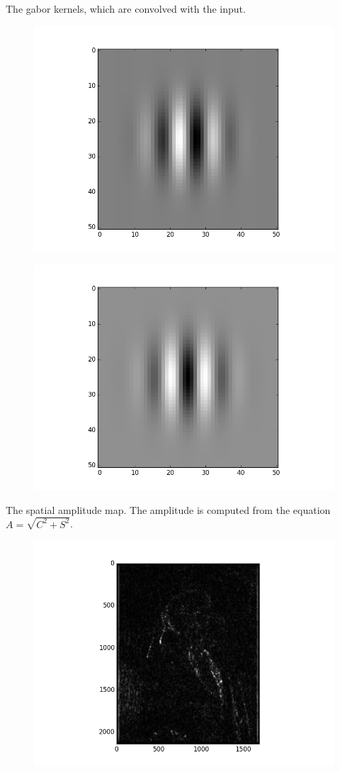 \documentclass[]{article}
\begin{document}
The gabor kernels, which are convolved with the input.
\begin{figure}
    \includegraphics{gabor_kernel.png}
\end{figure}
\begin{figure}
    \includegraphics{gabor_kernel2.png}
\end{figure}

The spatial amplitude map. The amplitude is computed from the equation $A =
\sqrt{C^{2}+S^{2}}$.
\begin{figure}
    \includegraphics{gabor_output.png}
\end{figure}
\end{document}
